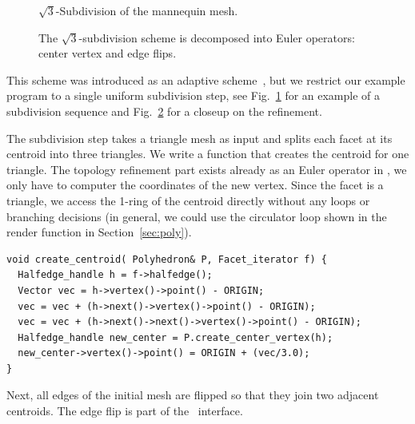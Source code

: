 \label{sec:sqrt3}

\begin{figure}
    \caption{$\sqrt{3}$-Subdivision of the mannequin mesh.}
    \label{fig:sqrt3}
\end{figure}

\begin{figure}[htb]
    \caption{The $\sqrt{3}$-subdivision scheme is decomposed into
             Euler operators: center vertex and edge flips.}
    \label{fig:sqrt3_basic}
\end{figure}

This scheme was introduced as an adaptive scheme~\cite{sqrt3}, but we
restrict our example program to a single uniform subdivision step, see
Fig.~\ref{fig:sqrt3} for an example of a subdivision sequence and
Fig.~\ref{fig:sqrt3_basic} for a closeup on the refinement.

The subdivision step takes a triangle mesh as input and splits each
facet at its centroid into three triangles.  We write a function that
creates the centroid for one triangle. The topology refinement part
exists already as an Euler operator in \cgalpoly, we only have to
computer the coordinates of the new vertex. Since the facet is a
triangle, we access the 1-ring of the centroid directly without any
loops or branching decisions (in general, we could use the circulator
loop shown in the render function in Section~\ref{sec:poly}).

\begin{lstlisting}
void create_centroid( Polyhedron& P, Facet_iterator f) {
  Halfedge_handle h = f->halfedge();
  Vector vec = h->vertex()->point() - ORIGIN;
  vec = vec + (h->next()->vertex()->point() - ORIGIN);
  vec = vec + (h->next()->next()->vertex()->point() - ORIGIN);
  Halfedge_handle new_center = P.create_center_vertex(h);
  new_center->vertex()->point() = ORIGIN + (vec/3.0);
}
\end{lstlisting}

Next, all edges of the initial mesh are flipped so that they join two
adjacent centroids. The edge flip is part of the \cgalpoly\ interface.

